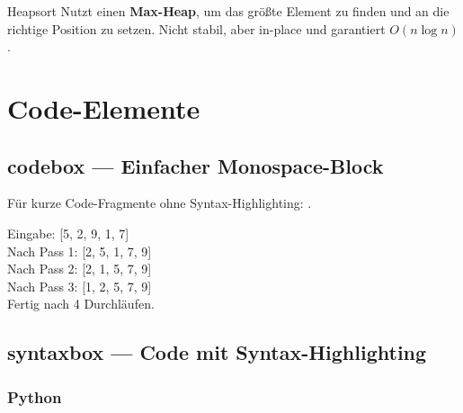 \begin{konzeptkarte}{Heapsort}
  Nutzt einen \textbf{Max-Heap}, um das größte Element zu finden und an
  die richtige Position zu setzen. Nicht stabil, aber in-place und
  garantiert $O(n \log n)$.

\end{konzeptkarte}

\section{Code-Elemente}

\subsection{codebox — Einfacher Monospace-Block}

Für kurze Code-Fragmente ohne Syntax-Highlighting: .

\begin{codebox}
Eingabe: [5, 2, 9, 1, 7]\\
Nach Pass 1: [2, 5, 1, 7, 9]\\
Nach Pass 2: [2, 1, 5, 7, 9]\\
Nach Pass 3: [1, 2, 5, 7, 9]\\
Fertig nach 4 Durchläufen.
\end{codebox}

\subsection{syntaxbox — Code mit Syntax-Highlighting}

\subsubsection{Python}

